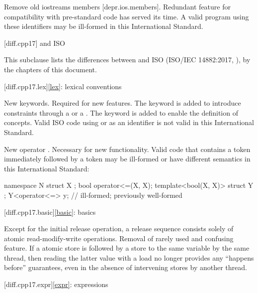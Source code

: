 \nodiffref
\change
Remove old iostreams members [depr.ios.members].
\rationale Redundant feature for compatibility with pre-standard code
has served its time.
\effect A valid \CppXIV{} program using these identifiers
may be ill-formed in this International Standard.

[diff.cpp17]{\Cpp{} and ISO \CppXVII{}}

\pnum
{}%
This subclause lists the differences between \Cpp{} and
ISO \CppXVII{} (ISO/IEC 14882:2017, ),
by the chapters of this document.

[diff.cpp17.lex]{\ref{lex}: lexical conventions}

\change New keywords.
\rationale Required for new features.
The  keyword is added
to introduce constraints through a  or
a . The  keyword is
added to enable the definition of concepts.
\effect
Valid ISO \CppXVII{} code using  or 
as an identifier is not valid in this International Standard.

\change New operator \tcode{<=>}.
\rationale Necessary for new functionality.
\effect Valid \CppXVII{} code that contains a \tcode{<=} token
immediately followed by a \tcode{>} token
may be ill-formed or have different semantics in this International Standard:
\begin{codeblock}
namespace N {
  struct X {};
  bool operator<=(X, X);
  template<bool(X, X)> struct Y {};
  Y<operator<=> y;              // ill-formed; previously well-formed
}
\end{codeblock}

[diff.cpp17.basic]{\ref{basic}: basics}

\change Except for the initial release operation,
a release sequence consists solely of atomic read-modify-write operations.
\rationale Removal of rarely used and confusing feature.
\effect If a  atomic store is followed
by a  store to the same variable by the same thread,
then reading the latter value with a  load
no longer provides any ``happens before'' guarantees,
even in the absence of intervening stores by another thread.

[diff.cpp17.expr]{\ref{expr}: expressions}

